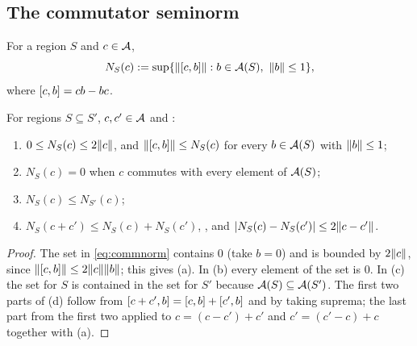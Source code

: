 \subsection{The commutator seminorm}\label{subsec:commnorm}


\begin{definition}\label{def:commnorm}
For a region $S$ and $c\in\mathcal A$,
\begin{equation}\label{eq:commnorm}
  N_S(c):=\sup\{\lVert [c,b]\rVert: b\in\mathcal A(S),\ \lVert b\rVert\le1\},
\end{equation}
where $[c,b]=cb-bc$.
\end{definition}

\begin{proposition}\label{prop:commnorm}
For regions $S\subseteq S'$, $c,c'\in\mathcal A$ and :
\begin{enumerate}[label=(\alph*),nosep]
\item $0\le N_S(c)\le2\lVert c\rVert$, and $\lVert [c,b]\rVert\le N_S(c)$ for every $b\in\mathcal A(S)$ with
  $\lVert b\rVert\le1$;
\item $N_S(c)=0$ when $c$ commutes with every element of $\mathcal A(S)$;
\item $N_S(c)\le N_{S'}(c)$;
\item $N_S(c+c')\le N_S(c)+N_S(c')$, , and $|N_S(c)-N_S(c')|\le2\lVert c-c'\rVert$.
\end{enumerate}
\end{proposition}

\begin{proof}
The set in \eqref{eq:commnorm} contains $0$ (take $b=0$) and is bounded by $2\lVert c\rVert$, since
$\lVert [c,b]\rVert\le2\lVert c\rVert\lVert b\rVert$; this gives (a). In (b) every element of the set is $0$.
In (c) the set for $S$ is contained in the set for $S'$ because $\mathcal A(S)\subseteq\mathcal A(S')$. The
first two parts of (d) follow from $[c+c',b]=[c,b]+[c',b]$ and
 by taking suprema; the last part from the first two applied to
$c=(c-c')+c'$ and $c'=(c'-c)+c$ together with (a).
\end{proof}

